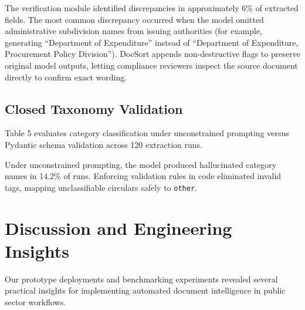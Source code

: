 \documentclass{article}
\begin{document}
The verification module identified discrepancies in approximately 6\% of extracted fields. The most common discrepancy occurred when the model omitted administrative subdivision names from issuing authorities (for example, generating ``Department of Expenditure'' instead of ``Department of Expenditure, Procurement Policy Division''). DocSort appends non-destructive flags to preserve original model outputs, letting compliance reviewers inspect the source document directly to confirm exact wording.

\subsection{Closed Taxonomy Validation}
Table 5 evaluates category classification under unconstrained prompting versus Pydantic schema validation across 120 extraction runs.

\begin{table}[t]
\centering
{}
\caption{Category taxonomy compliance across 120 extraction runs.}
\label{tab:taxonomy}
\end{table}

Under unconstrained prompting, the model produced hallucinated category names in 14.2\% of runs. Enforcing validation rules in code eliminated invalid tags, mapping unclassifiable circulars safely to \texttt{other}.

\section{Discussion and Engineering Insights}

Our prototype deployments and benchmarking experiments revealed several practical insights for implementing automated document intelligence in public sector workflows.
\end{document}
